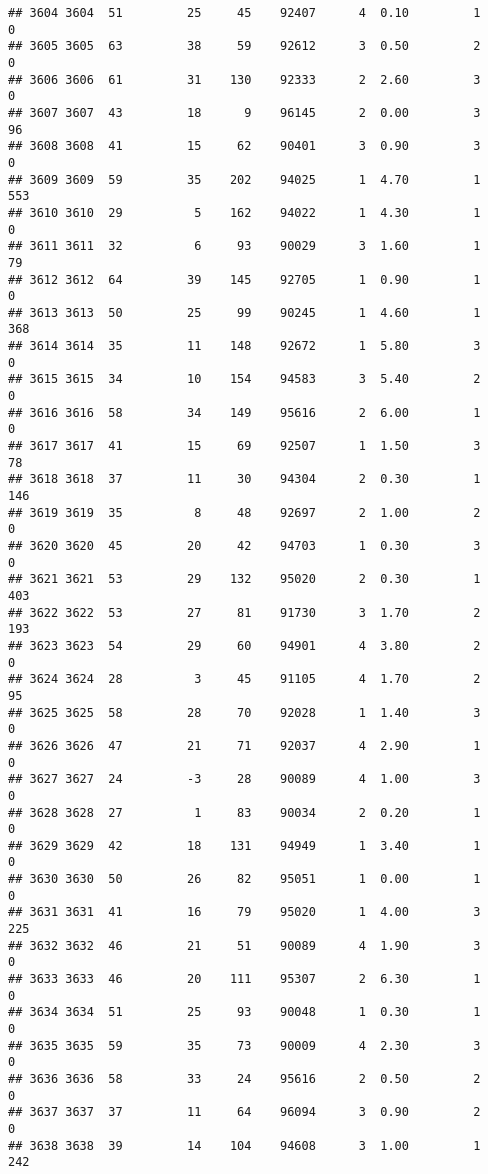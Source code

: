 \documentclass[
]{article}
\begin{document}
\begin{verbatim}
## 3604 3604  51         25     45    92407      4  0.10         1        0
## 3605 3605  63         38     59    92612      3  0.50         2        0
## 3606 3606  61         31    130    92333      2  2.60         3        0
## 3607 3607  43         18      9    96145      2  0.00         3       96
## 3608 3608  41         15     62    90401      3  0.90         3        0
## 3609 3609  59         35    202    94025      1  4.70         1      553
## 3610 3610  29          5    162    94022      1  4.30         1        0
## 3611 3611  32          6     93    90029      3  1.60         1       79
## 3612 3612  64         39    145    92705      1  0.90         1        0
## 3613 3613  50         25     99    90245      1  4.60         1      368
## 3614 3614  35         11    148    92672      1  5.80         3        0
## 3615 3615  34         10    154    94583      3  5.40         2        0
## 3616 3616  58         34    149    95616      2  6.00         1        0
## 3617 3617  41         15     69    92507      1  1.50         3       78
## 3618 3618  37         11     30    94304      2  0.30         1      146
## 3619 3619  35          8     48    92697      2  1.00         2        0
## 3620 3620  45         20     42    94703      1  0.30         3        0
## 3621 3621  53         29    132    95020      2  0.30         1      403
## 3622 3622  53         27     81    91730      3  1.70         2      193
## 3623 3623  54         29     60    94901      4  3.80         2        0
## 3624 3624  28          3     45    91105      4  1.70         2       95
## 3625 3625  58         28     70    92028      1  1.40         3        0
## 3626 3626  47         21     71    92037      4  2.90         1        0
## 3627 3627  24         -3     28    90089      4  1.00         3        0
## 3628 3628  27          1     83    90034      2  0.20         1        0
## 3629 3629  42         18    131    94949      1  3.40         1        0
## 3630 3630  50         26     82    95051      1  0.00         1        0
## 3631 3631  41         16     79    95020      1  4.00         3      225
## 3632 3632  46         21     51    90089      4  1.90         3        0
## 3633 3633  46         20    111    95307      2  6.30         1        0
## 3634 3634  51         25     93    90048      1  0.30         1        0
## 3635 3635  59         35     73    90009      4  2.30         3        0
## 3636 3636  58         33     24    95616      2  0.50         2        0
## 3637 3637  37         11     64    96094      3  0.90         2        0
## 3638 3638  39         14    104    94608      3  1.00         1      242

\end{verbatim}
\end{document}
